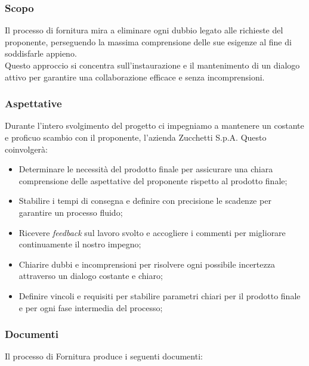 \documentclass[5pt]{article}
\begin{document}
\subsubsection{Scopo}

Il processo di fornitura mira a eliminare ogni dubbio legato alle richieste del proponente, perseguendo la massima comprensione delle sue esigenze al fine di soddisfarle appieno.\\
Questo approccio si concentra sull'instaurazione e il mantenimento di un dialogo attivo per garantire una collaborazione efficace e senza incomprensioni.

\subsubsection{Aspettative }

Durante l'intero svolgimento del progetto ci impegniamo a mantenere un costante e proficuo scambio con il proponente, l'azienda Zucchetti S.p.A. Questo coinvolgerà:
\begin{itemize}
    \item Determinare le necessità del prodotto finale per assicurare una chiara comprensione delle aspettative del proponente rispetto al prodotto finale;
    \item Stabilire i tempi di consegna e definire con precisione le scadenze per garantire un processo fluido;
    \item Ricevere \textit{feedback} sul lavoro svolto e accogliere i commenti per migliorare continuamente il nostro impegno;
    \item Chiarire dubbi e incomprensioni per risolvere ogni possibile incertezza attraverso un dialogo costante e chiaro;
    \item Definire vincoli e requisiti per stabilire parametri chiari per il prodotto finale e per ogni fase intermedia del processo;
\end{itemize}

\subsubsection{Documenti}
Il processo di Fornitura produce i seguenti documenti:
\end{document}
